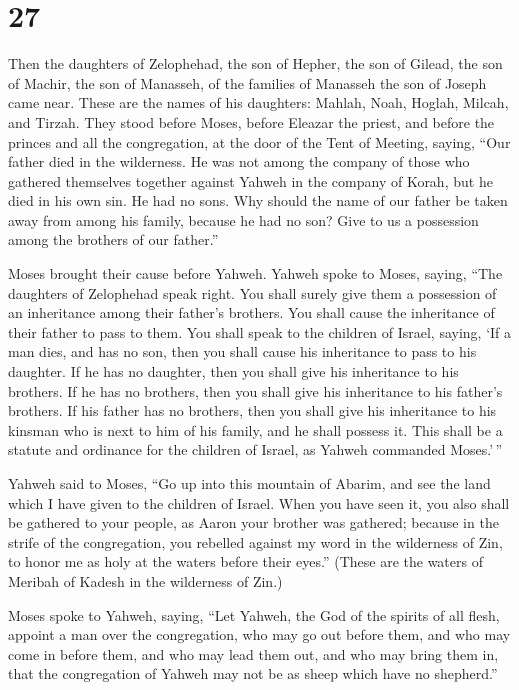 \hypertarget{section-26}{%
\section{27}\label{section-26}}

 Then the daughters of Zelophehad, the son of Hepher, the
son of Gilead, the son of Machir, the son of Manasseh, of the families
of Manasseh the son of Joseph came near. These are the names of his
daughters: Mahlah, Noah, Hoglah, Milcah, and Tirzah.  They
stood before Moses, before Eleazar the priest, and before the princes
and all the congregation, at the door of the Tent of Meeting, saying,
 ``Our father died in the wilderness. He was not among the
company of those who gathered themselves together against Yahweh in the
company of Korah, but he died in his own sin. He had no sons.
 Why should the name of our father be taken away from among
his family, because he had no son? Give to us a possession among the
brothers of our father.''

 Moses brought their cause before Yahweh. 
Yahweh spoke to Moses, saying,  ``The daughters of
Zelophehad speak right. You shall surely give them a possession of an
inheritance among their father's brothers. You shall cause the
inheritance of their father to pass to them.  You shall
speak to the children of Israel, saying, `If a man dies, and has no son,
then you shall cause his inheritance to pass to his daughter.
 If he has no daughter, then you shall give his inheritance
to his brothers.  If he has no brothers, then you shall
give his inheritance to his father's brothers.  If his
father has no brothers, then you shall give his inheritance to his
kinsman who is next to him of his family, and he shall possess it. This
shall be a statute and ordinance for the children of Israel, as Yahweh
commanded Moses.'\,''

 Yahweh said to Moses, ``Go up into this mountain of
Abarim, and see the land which I have given to the children of Israel.
 When you have seen it, you also shall be gathered to your
people, as Aaron your brother was gathered;  because in the
strife of the congregation, you rebelled against my word in the
wilderness of Zin, to honor me as holy at the waters before their
eyes.'' (These are the waters of Meribah of Kadesh in the wilderness of
Zin.)

 Moses spoke to Yahweh, saying,  ``Let Yahweh,
the God of the spirits of all flesh, appoint a man over the
congregation,  who may go out before them, and who may come
in before them, and who may lead them out, and who may bring them in,
that the congregation of Yahweh may not be as sheep which have no
shepherd.''

